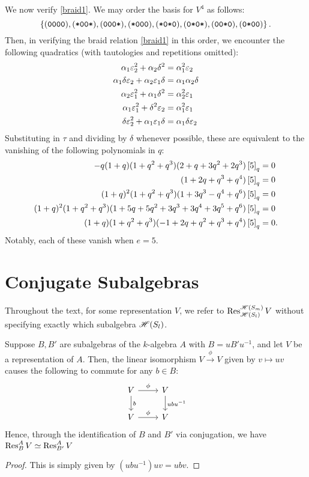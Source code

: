 \documentclass{amsart}
\begin{document}
\vspace{7pt}
We now verify \eqref{braid1}.
We may order the basis for $V^4$ as follows:
\[
  \left\{ (\texttt{0}\texttt{0}\texttt{0}\texttt{0}),(\texttt{*}\texttt{0}\texttt{0}\texttt{*}),(\texttt{0}\texttt{0}\texttt{0}\texttt{*}),(\texttt{*}\texttt{0}\texttt{0}\texttt{0}),(\texttt{*}\texttt{0}\texttt{*}\texttt{0}),(\texttt{0}\texttt{*}\texttt{0}\texttt{*}),(\texttt{0}\texttt{0}\texttt{*}\texttt{0}),(\texttt{0}\texttt{*}\texttt{0}\texttt{0}) \right\}.
\]
Then, in verifying the braid relation \eqref{braid1} in this order, we encounter the following quadratics (with tautologies and repetitions omitted):
\begin{align*}
    \alpha_1\varepsilon_2^2 + \alpha_2\delta^2 &= \alpha_1^2 \varepsilon_2\\
    \alpha_1\delta\varepsilon_2 + \alpha_2\varepsilon_1\delta &= \alpha_1\alpha_2\delta\\
    \alpha_2\varepsilon_1^2 + \alpha_1\delta^2 &= \alpha_2^2\varepsilon_1\\
    \alpha_1\varepsilon_1^2 + \delta^2\varepsilon_2 &= \alpha_1^2\varepsilon_1\\
    \delta\varepsilon_2^2 + \alpha_1\varepsilon_1\delta &= \alpha_1\delta\varepsilon_2
\end{align*}
Substituting in $\tau$ and dividing by $\delta$ whenever possible, these are equivalent to the vanishing of the following polynomials in $q$:
\begin{align*}
  -q (1 + q) (1 + q^2 + q^3) (2 + q + 3 q^2 + 2 q^3) \left[ 5 \right]_q &= 0\\
  (1 + 2 q + q^3 + q^4) \left[ 5 \right]_q &= 0\\
  (1+q)^2 (1+q^2+q^3) (1+3q^3 - q^4 + q^6)\left[ 5 \right]_q &= 0\\
  (1+q)^2 (1+q^2+q^3) (1+5q+5q^2+3q^3+3q^4+3q^5+q^6)\left[ 5 \right]_q &= 0\\
  (1+q) (1+q^2+q^3) (-1+2q+q^2+q^3+q^4)\left[ 5 \right]_q &= 0.
\end{align*}
Notably, each of these vanish when $e = 5$.
  
\section{Conjugate Subalgebras}\label{Algebra}
Throughout the text, for some representation $V$, we refer to $\operatorname{Res}_{\mathscr{H}(S_{l})}^{\mathscr{H}(S_m)} V$ without specifying exactly which subalgebra $\mathscr{H}(S_{l})$.
\begin{proposition}
  Suppose $B,B'$ are subalgebras of the $k$-algebra $A$ with $B = uB'u^{-1}$, and let $V$ be a representation of $A$.
  Then, the linear isomorphism $V \xrightarrow{\phi} V$ given by $v \mapsto uv$ causes the following to commute for any $b \in B$:
  \[
    \begin{tikzcd}
      V \arrow[r,"\phi"] \arrow[d,"b"] & V \arrow[d,"ubu^{-1}"]\\
      V \arrow[r,"\phi"] & V
    \end{tikzcd}
  \]
  Hence, through the identification of $B$ and $B'$ via conjugation, we have $\operatorname{Res}_{B}^A V \simeq \operatorname{Res}_{B'}^A V$
\end{proposition}
\begin{proof}
  This is simply given by $(ubu^{-1})uv = ubv$.
\end{proof}
\end{document}
